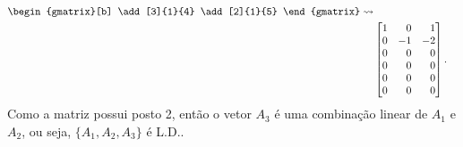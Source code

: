 \begin{exemplo}
\begin{enumerate}[label={\arabic*})]
\begin{solucao}
\begin{align*}
\begin{gmatrix}[b]
			   		\add[3]{1}{4}
			   		\add[2]{1}{5}
     			\end{gmatrix}\leadsto\\&\begin{bmatrix}
  					1 & \phantom{-}0 & \phantom{-}1\\
					0 & -1 & -2\\
					0 & \phantom{-}0 & \phantom{-}0\\
					0 & \phantom{-}0 & \phantom{-}0\\
					0 & \phantom{-}0 & \phantom{-}0\\
					0 & \phantom{-}0 & \phantom{-}0
     			\end{bmatrix}.
     		\end{align*}
     		Como a matriz possui posto 2, ent\~ao o vetor $A_3$ \'e uma combina\c{c}\~ao linear de $A_1$ e $A_2$, ou seja, $\{A_1, A_2, A_3\}$ \'e L.D..
		\end{solucao}
	\end{enumerate}
\end{exemplo}


